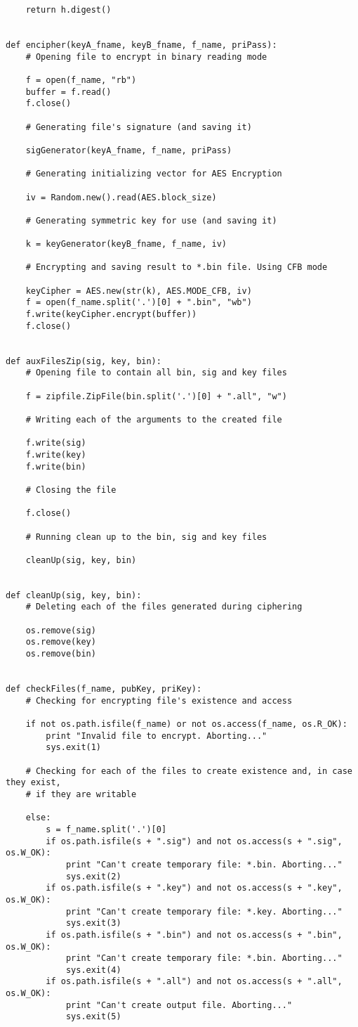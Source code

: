 \documentclass[a4paper,11pt,openright,oneside]{report}
\begin{document}
\begin{verbatim}
    return h.digest()


def encipher(keyA_fname, keyB_fname, f_name, priPass):
    # Opening file to encrypt in binary reading mode

    f = open(f_name, "rb")
    buffer = f.read()
    f.close()

    # Generating file's signature (and saving it)

    sigGenerator(keyA_fname, f_name, priPass)

    # Generating initializing vector for AES Encryption

    iv = Random.new().read(AES.block_size)

    # Generating symmetric key for use (and saving it)

    k = keyGenerator(keyB_fname, f_name, iv)

    # Encrypting and saving result to *.bin file. Using CFB mode

    keyCipher = AES.new(str(k), AES.MODE_CFB, iv)
    f = open(f_name.split('.')[0] + ".bin", "wb")
    f.write(keyCipher.encrypt(buffer))
    f.close()


def auxFilesZip(sig, key, bin):
    # Opening file to contain all bin, sig and key files

    f = zipfile.ZipFile(bin.split('.')[0] + ".all", "w")

    # Writing each of the arguments to the created file

    f.write(sig)
    f.write(key)
    f.write(bin)

    # Closing the file

    f.close()

    # Running clean up to the bin, sig and key files

    cleanUp(sig, key, bin)


def cleanUp(sig, key, bin):
    # Deleting each of the files generated during ciphering

    os.remove(sig)
    os.remove(key)
    os.remove(bin)


def checkFiles(f_name, pubKey, priKey):
    # Checking for encrypting file's existence and access

    if not os.path.isfile(f_name) or not os.access(f_name, os.R_OK):
        print "Invalid file to encrypt. Aborting..."
        sys.exit(1)

    # Checking for each of the files to create existence and, in case they exist,
    # if they are writable

    else:
        s = f_name.split('.')[0]
        if os.path.isfile(s + ".sig") and not os.access(s + ".sig", os.W_OK):
            print "Can't create temporary file: *.bin. Aborting..."
            sys.exit(2)
        if os.path.isfile(s + ".key") and not os.access(s + ".key", os.W_OK):
            print "Can't create temporary file: *.key. Aborting..."
            sys.exit(3)
        if os.path.isfile(s + ".bin") and not os.access(s + ".bin", os.W_OK):
            print "Can't create temporary file: *.bin. Aborting..."
            sys.exit(4)
        if os.path.isfile(s + ".all") and not os.access(s + ".all", os.W_OK):
            print "Can't create output file. Aborting..."
            sys.exit(5)


\end{verbatim}
\end{document}
